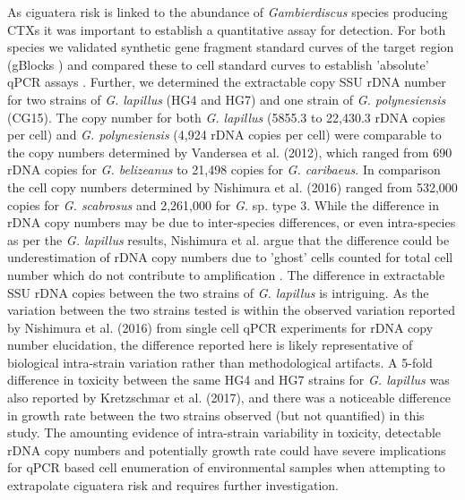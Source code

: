 \documentclass[12pt]{article}
\begin{document}
As ciguatera risk is linked to the abundance of \emph{Gambierdiscus} species producing CTXs it was important to establish a quantitative assay for detection.
For both species we validated synthetic gene fragment standard curves of the target region (gBlocks \textsuperscript{\textregistered}) and compared these to cell standard curves to establish 'absolute' qPCR assays \citep{nishimura2016quantitative,hariganeya2013quantitative}. Further, we determined the extractable copy SSU rDNA number for two strains of \emph{G. lapillus} (HG4 and HG7) and one strain of \emph{G. polynesiensis} (CG15). The copy number for both \emph{G. lapillus} (5855.3 to 22,430.3 rDNA copies per cell) and \emph{G. polynesiensis} (4,924 rDNA copies per cell) were comparable to the copy numbers determined by Vandersea et al. (2012), which ranged from 690 rDNA copies for \emph{G. belizeanus} to 21,498 copies for \emph{G. caribaeus}. In comparison the cell copy numbers determined by Nishimura et al. (2016) ranged from 532,000 copies for \emph{G. scabrosus} and 2,261,000 for \emph{G.} sp. type 3. While the difference in rDNA copy numbers may be due to inter-species differences, or even intra-species as per the \emph{G. lapillus} results, Nishimura et al. argue that the difference could be underestimation of rDNA copy numbers due to 'ghost' cells counted for total cell number which do not contribute to amplification \citep{nishimura2016quantitative,hariganeya2013quantitative}.
The difference in extractable SSU rDNA copies between the two strains of \emph{G. lapillus} is intriguing. As the variation between the two strains tested is within the observed variation reported by Nishimura et al. (2016) from single cell qPCR experiments for rDNA copy number elucidation, the difference reported here is likely representative of biological intra-strain variation rather than methodological artifacts. A 5-fold difference in toxicity between the same HG4 and HG7 strains for \emph{G. lapillus} was also reported by Kretzschmar et al. (2017), and there was a noticeable difference in growth rate between the two strains observed (but not quantified) in this study. The amounting evidence of intra-strain variability in toxicity, detectable rDNA copy numbers and potentially growth rate could have severe implications for qPCR based cell enumeration of environmental samples when attempting to extrapolate ciguatera risk and requires further investigation.\\
\end{document}
